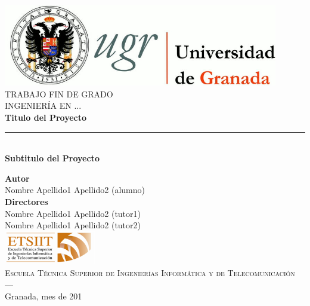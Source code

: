 \begin{titlepage}
  
\newlength{\centeroffset}
\setlength{\centeroffset}{-0.5\oddsidemargin}
\addtolength{\centeroffset}{0.5\evensidemargin}
\thispagestyle{empty}
\noindent\hspace*{\centeroffset}

\begin{minipage}{\textwidth}

\centering

\includegraphics[width=0.9\textwidth]{Images/UGR.jpg}\\[1.4cm]

\textsc{ \Large TRABAJO FIN DE GRADO\\[0.2cm]}
\textsc{ INGENIERÍA EN ...}\\[1cm]{\Huge\bfseries Titulo del Proyecto\\}
\noindent\rule[-1ex]{\textwidth}{3pt}\\[3.5ex]{\large\bfseries Subtitulo del Proyecto}

\end{minipage}

\vspace{2.5cm}
\noindent\hspace*{\centeroffset}\begin{minipage}{\textwidth}
\centering
\textbf{Autor}\\ {Nombre Apellido1 Apellido2 (alumno)}\\[2.5ex]
\textbf{Directores}\\{Nombre Apellido1 Apellido2 (tutor1)\\Nombre Apellido1 Apellido2 (tutor2)}\\[2cm]

\includegraphics[width=0.3\textwidth]{Images/ETSIIT.png}\\[0.1cm]

\textsc{Escuela Técnica Superior de Ingenierías Informática y de Telecomunicación}\\
\textsc{---}\\Granada, mes de 201

\end{minipage}

\end{titlepage}